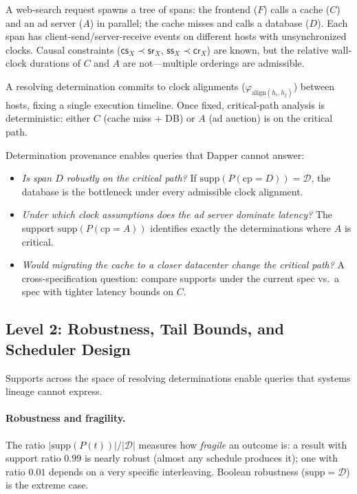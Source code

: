 \begin{example}
  \label{ex:dapper}
  A web-search request spawns a tree of spans: the frontend ($F$)
  calls a cache ($C$) and an ad server ($A$) in parallel; the cache
  misses and calls a database ($D$).
  Each span has client-send/server-receive events on different hosts
  with unsynchronized clocks.
  Causal constraints ($\mathsf{cs}_X \prec \mathsf{sr}_X$,
  $\mathsf{ss}_X \prec \mathsf{cr}_X$) are known, but the relative
  wall-clock durations of $C$ and $A$ are not---multiple orderings are
  admissible.

  A resolving determination commits to clock alignments
  ($\varphi_{\mathrm{align}(h_i,h_j)}$) between hosts, fixing a single
  execution timeline.
  Once fixed, critical-path analysis is deterministic: either $C$
  (cache miss + DB) or $A$ (ad auction) is on the critical path.

  Determination provenance enables queries that Dapper cannot answer:
  \begin{itemize}[nosep]
    \item \emph{Is span $D$ robustly on the critical path?}
          If $\mathrm{supp}(P(\mathrm{cp}=D)) = \mathcal{D}$, the
          database is the bottleneck under every admissible clock
          alignment.
    \item \emph{Under which clock assumptions does the ad server
          dominate latency?}
          The support $\mathrm{supp}(P(\mathrm{cp}=A))$ identifies
          exactly the determinations where $A$ is critical.
    \item \emph{Would migrating the cache to a closer datacenter
          change the critical path?}
          A cross-specification question: compare supports under the
          current spec vs.\ a spec with tighter latency bounds on $C$.
  \end{itemize}
\end{example}

\subsection{Level 2: Robustness, Tail Bounds, and Scheduler Design}

Supports across the space of resolving determinations enable queries
that systems lineage cannot express.

\paragraph{Robustness and fragility.}
The ratio $|\mathrm{supp}(P(t))| / |\mathcal{D}|$ measures how
\emph{fragile} an outcome is: a result with support ratio $0.99$ is
nearly robust (almost any schedule produces it); one with ratio $0.01$
depends on a very specific interleaving.
Boolean robustness ($\mathrm{supp} = \mathcal{D}$) is the extreme case.

